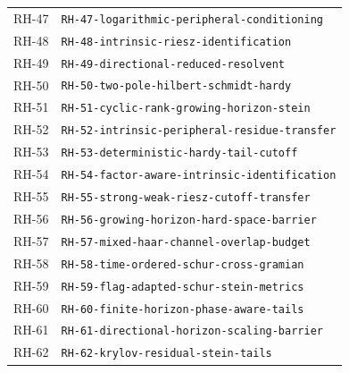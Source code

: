 \begin{longtable}{r >{\raggedright\arraybackslash}p{}}
RH-47 & \texttt{RH-\allowbreak{}47-\allowbreak{}logarithmic-\allowbreak{}peripheral-\allowbreak{}conditioning}\\
RH-48 & \texttt{RH-\allowbreak{}48-\allowbreak{}intrinsic-\allowbreak{}riesz-\allowbreak{}identification}\\
RH-49 & \texttt{RH-\allowbreak{}49-\allowbreak{}directional-\allowbreak{}reduced-\allowbreak{}resolvent}\\
RH-50 & \texttt{RH-\allowbreak{}50-\allowbreak{}two-\allowbreak{}pole-\allowbreak{}hilbert-\allowbreak{}schmidt-\allowbreak{}hardy}\\
RH-51 & \texttt{RH-\allowbreak{}51-\allowbreak{}cyclic-\allowbreak{}rank-\allowbreak{}growing-\allowbreak{}horizon-\allowbreak{}stein}\\
RH-52 & \texttt{RH-\allowbreak{}52-\allowbreak{}intrinsic-\allowbreak{}peripheral-\allowbreak{}residue-\allowbreak{}transfer}\\
RH-53 & \texttt{RH-\allowbreak{}53-\allowbreak{}deterministic-\allowbreak{}hardy-\allowbreak{}tail-\allowbreak{}cutoff}\\
RH-54 & \texttt{RH-\allowbreak{}54-\allowbreak{}factor-\allowbreak{}aware-\allowbreak{}intrinsic-\allowbreak{}identification}\\
RH-55 & \texttt{RH-\allowbreak{}55-\allowbreak{}strong-\allowbreak{}weak-\allowbreak{}riesz-\allowbreak{}cutoff-\allowbreak{}transfer}\\
RH-56 & \texttt{RH-\allowbreak{}56-\allowbreak{}growing-\allowbreak{}horizon-\allowbreak{}hard-\allowbreak{}space-\allowbreak{}barrier}\\
RH-57 & \texttt{RH-\allowbreak{}57-\allowbreak{}mixed-\allowbreak{}haar-\allowbreak{}channel-\allowbreak{}overlap-\allowbreak{}budget}\\
RH-58 & \texttt{RH-\allowbreak{}58-\allowbreak{}time-\allowbreak{}ordered-\allowbreak{}schur-\allowbreak{}cross-\allowbreak{}gramian}\\
RH-59 & \texttt{RH-\allowbreak{}59-\allowbreak{}flag-\allowbreak{}adapted-\allowbreak{}schur-\allowbreak{}stein-\allowbreak{}metrics}\\
RH-60 & \texttt{RH-\allowbreak{}60-\allowbreak{}finite-\allowbreak{}horizon-\allowbreak{}phase-\allowbreak{}aware-\allowbreak{}tails}\\
RH-61 & \texttt{RH-\allowbreak{}61-\allowbreak{}directional-\allowbreak{}horizon-\allowbreak{}scaling-\allowbreak{}barrier}\\
RH-62 & \texttt{RH-\allowbreak{}62-\allowbreak{}krylov-\allowbreak{}residual-\allowbreak{}stein-\allowbreak{}tails}\\

\end{longtable}
